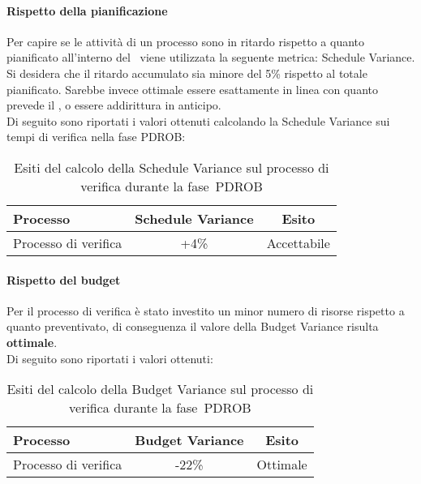 \documentclass[../PianoDiQualifica.tex]{subfiles}
\begin{document}
\begin{appendices}
			\paragraph{Rispetto della pianificazione}
			Per capire se le attività di un processo sono in ritardo rispetto a quanto pianificato all'interno del \pianodiprogetto\ viene utilizzata la seguente metrica: Schedule Variance.\\
			Si desidera che il ritardo accumulato sia minore del 5\% rispetto al totale pianificato. Sarebbe invece ottimale essere esattamente in linea con quanto prevede il \pianodiprogetto, o essere addirittura in anticipo.\\
			Di seguito sono riportati i valori ottenuti calcolando la Schedule Variance sui tempi di verifica nella fase PDROB:
			\begin{table}[H]
				\centering
				\begin{tabular}{l * {2}{c}}
					\toprule
					\textbf{Processo} & \textbf{Schedule Variance} & \textbf{Esito} \\
					\midrule
					Processo di verifica & +4\% &  Accettabile \\
					\bottomrule
				\end{tabular}
				\caption{Esiti del calcolo della Schedule Variance sul processo di verifica durante la fase\g\ PDROB}
				\label{tab:esiti_schedule_variance}
			\end{table}
			
			\paragraph{Rispetto del budget}
			Per il processo di verifica è stato investito un minor numero di risorse rispetto a quanto preventivato, di conseguenza il valore della Budget Variance risulta \textbf{ottimale}.\\
			Di seguito sono riportati i valori ottenuti:
			\begin{table}[H]
				\centering
				\begin{tabular}{l * {2}{c}}
					\toprule
					\textbf{Processo} & \textbf{Budget Variance} & \textbf{Esito} \\
					\midrule
					Processo di verifica & -22\% &  Ottimale \\
					\bottomrule
				\end{tabular}
				\caption{Esiti del calcolo della Budget Variance sul processo di verifica durante la fase\g\ PDROB}
				\label{tab:esiti_budget_variance}
			\end{table}
			

\end{appendices}
\end{document}
